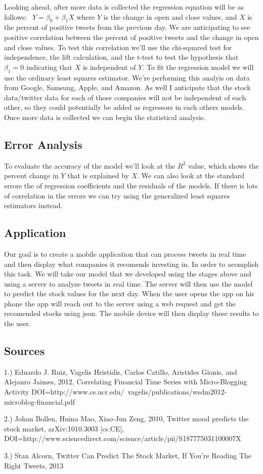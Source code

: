 \documentclass{acm_proc_article-sp}
\begin{document}
Looking ahead, after more data is collected the regression equation will be as
follows: $ \ \ Y = \beta_0 + \beta_1X $ where $Y$ is the change in open and
close values, and $X$ is the percent of positive tweets from the previous day.
We are anticipating to see positive correlation between the percent of positive
tweets and the change in open and close values. To test this correlation we'll
use the chi-squared test for independence, the lift calculation, and the t-test
to test the hypothesis that $\beta_1 = 0$ indicating that $X$ is independent of
$Y$. To fit the regression model we will use the ordinary least squares
estimator. We're performing this analyis on data from Google, Samsung, Apple,
and Amazon. As well I anticipate that the stock data/twitter data for each of
those companies will not be independent of each other, so they could
potentially be added as regressors in each others models. Once more data is
collected we can begin the statistical analysis. 

\subsection{Error Analysis}

To evaluate the accuracy of the model we'll look at the $R^2$ value, which
shows the percent change in $Y$ that is explained by $X$. We can also look at
the standard errors the of regression coefficients and the residuals of the
models. If there is lots of correlation in the errors we can try using the
generalized least squares estimators instead. 


\subsection{Application}

Our goal is to create a mobile application that can process tweets in real time
and then display what companies it recomends investing in. In order to
acomplish this task. We will take our model that we developed using the stages
above and using a server to analyze tweets in real time. The server will then
use the model to predict the stock values for the next day. When the user opens
the app on his phone the app will reach out to the server using a web request
and get the recomended stocks using json. The mobile device will then display
these results to the user.

\subsection{Sources}

1.) Eduardo J. Ruiz, Vagelis Hristidis, Carlos Catillo, Aristides Gionis, and
Alejanro Jaimes,  2012, Correlating Financial Time Series with Micro-Blogging
Activity
DOI=http://www.cs.ucr.edu/~vagelis/publications/wsdm2012-microblog-financial.pdf 

2.) Johan Bollen, Huina Mao, Xiao-Jun Zeng, 2010, Twitter mood predicts the stock
market, arXiv:1010.3003 [cs.CE],
DOI=http://www.sciencedirect.com/science/article/pii/S187775031100007X


3.) Stan Alcorn, Twitter Can Predict The Stock Market, If You're Reading The Right
Tweets, 2013

 
\end{document}
